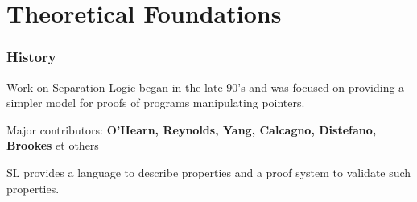\documentclass{beamer}
\begin{document}
    \section{Theoretical Foundations}
    \begin{frame}
        \frametitle{History}
        \begin{card}
            Work on Separation Logic began in the late 90's and was focused 
            on providing a simpler model for proofs of programs manipulating pointers. 
        \end{card}
        \begin{card}
            Major contributors: \textbf{O'Hearn, Reynolds, Yang, Calcagno,  Distefano, Brookes} et others
        \end{card}
        \begin{cardTiny}
        SL provides a language to describe properties and a proof system to validate such properties.
        \end{cardTiny}
    \end{frame}
\end{document}
